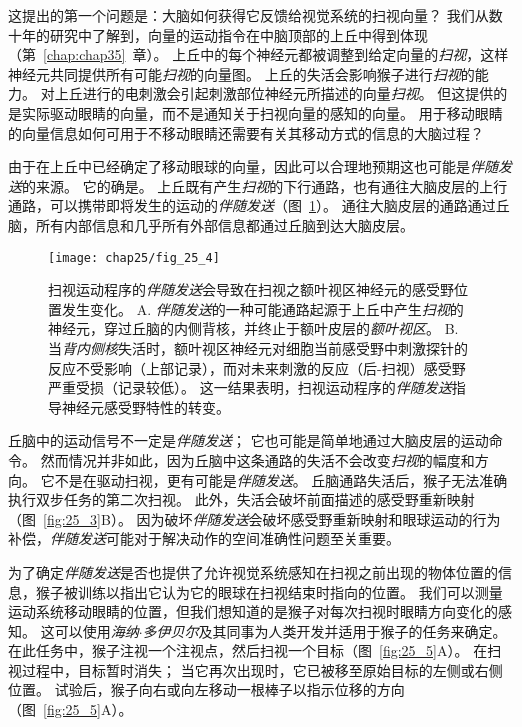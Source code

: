 这提出的第一个问题是：大脑如何获得它反馈给视觉系统的扫视向量？
我们从数十年的研究中了解到，向量的运动指令在中脑顶部的上丘中得到体现（第~\ref{chap:chap35}~章）。
上丘中的每个神经元都被调整到给定向量的\textit{扫视}，这样神经元共同提供所有可能\textit{扫视}的向量图。
上丘的失活会影响猴子进行\textit{扫视}的能力。
对上丘进行的电刺激会引起刺激部位神经元所描述的向量\textit{扫视}。 
但这提供的是实际驱动眼睛的向量，而不是通知关于扫视向量的感知的向量。
用于移动眼睛的向量信息如何可用于不移动眼睛还需要有关其移动方式的信息的大脑过程？


由于在上丘中已经确定了移动眼球的向量，因此可以合理地预期这也可能是\textit{伴随发送}的来源。
它的确是。
上丘既有产生\textit{扫视}的下行通路，也有通往大脑皮层的上行通路，可以携带即将发生的运动的\textit{伴随发送}（图~\ref{fig:25_4}）。
通往大脑皮层的通路通过丘脑，所有内部信息和几乎所有外部信息都通过丘脑到达大脑皮层。


\begin{figure}[htbp]
	\centering
	\texttt{[image: chap25/fig\_25\_4]}
	\caption{扫视运动程序的\textit{伴随发送}会导致在扫视之额叶视区神经元的感受野位置发生变化\cite{sommer2008brain}。
		A. \textit{伴随发送}的一种可能通路起源于上丘中产生\textit{扫视}的神经元，穿过丘脑的内侧背核，并终止于额叶皮层的\textit{额叶视区}。
		B. 当\textit{背内侧核}失活时，额叶视区神经元对细胞当前感受野中刺激探针的反应不受影响（上部记录），而对未来刺激的反应（后-扫视）感受野严重受损（记录较低）。
		这一结果表明，扫视运动程序的\textit{伴随发送}指导神经元感受野特性的转变。}
	\label{fig:25_4}
\end{figure}


丘脑中的运动信号不一定是\textit{伴随发送}；
它也可能是简单地通过大脑皮层的运动命令。
然而情况并非如此，因为丘脑中这条通路的失活不会改变\textit{扫视}的幅度和方向。
它不是在驱动扫视，更有可能是\textit{伴随发送}。
丘脑通路失活后，猴子无法准确执行双步任务的第二次扫视。
此外，失活会破坏前面描述的感受野重新映射（图~\ref{fig:25_3}B）。
因为破坏\textit{伴随发送}会破坏感受野重新映射和眼球运动的行为补偿，\textit{伴随发送}可能对于解决动作的空间准确性问题至关重要。


为了确定\textit{伴随发送}是否也提供了允许视觉系统感知在扫视之前出现的物体位置的信息，猴子被训练以指出它认为它的眼球在扫视结束时指向的位置。
我们可以测量运动系统移动眼睛的位置，但我们想知道的是猴子对每次扫视时眼睛方向变化的感知。
这可以使用\textit{海纳$\cdot$多伊贝尔}及其同事为人类开发并适用于猴子的任务来确定。
在此任务中，猴子注视一个注视点，然后扫视一个目标（图~\ref{fig:25_5}A）。
在扫视过程中，目标暂时消失；
当它再次出现时，它已被移至原始目标的左侧或右侧位置。
试验后，猴子向右或向左移动一根棒子以指示位移的方向（图~\ref{fig:25_5}A）。


